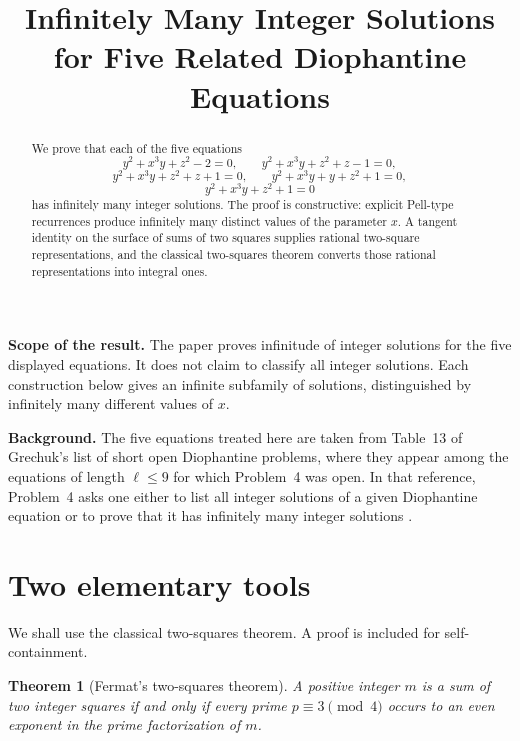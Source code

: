 \documentclass{article}
\title{Infinitely Many Integer Solutions for Five Related Diophantine Equations}
\author{}
\date{}
\theoremstyle{plain}
\theoremstyle{remark}
\theoremstyle{myconjecture}
\theoremstyle{plain}
\newtheorem{theorem}{Theorem}[section]
\theoremstyle{definition}
\numberwithin{equation}{section} %
\begin{document}
\maketitle

\begin{abstract}
We prove that each of the five equations
\[
 y^2+x^3y+z^2-2=0,\qquad
 y^2+x^3y+z^2+z-1=0,
\]
\[
 y^2+x^3y+z^2+z+1=0,\qquad
 y^2+x^3y+y+z^2+1=0,
\]
\[
 y^2+x^3y+z^2+1=0
\]
has infinitely many integer solutions.  The proof is constructive: explicit
Pell-type recurrences produce infinitely many distinct values of the parameter
\(x\).  A tangent identity on the surface of sums of two squares supplies
rational two-square representations, and the classical two-squares theorem
converts those rational representations into integral ones.
\end{abstract}

\noindent\textbf{Scope of the result.}
The paper proves infinitude of integer solutions for the five displayed
equations.  It does not claim to classify all integer solutions.  Each
construction below gives an infinite subfamily of solutions, distinguished by
infinitely many different values of \(x\).


\noindent\textbf{Background.}
The five equations treated here are taken from Table~13 of Grechuk's list of
short open Diophantine problems, where they appear among the equations of
length \(\ell\le 9\) for which Problem~4 was open.  In that reference,
Problem~4 asks one either to list all integer solutions of a given Diophantine
equation or to prove that it has infinitely many integer solutions
\cite[Problem~4 and Table~13]{Grechuk2024}.

\section{Two elementary tools}

We shall use the classical two-squares theorem.  A proof is included for
self-containment.

\begin{theorem}[Fermat's two-squares theorem]\label{thm:two-squares}
A positive integer \(m\) is a sum of two integer squares if and only if every
prime \(p\equiv3\pmod4\) occurs to an even exponent in the prime factorization
of \(m\).
\end{theorem}
\end{document}
